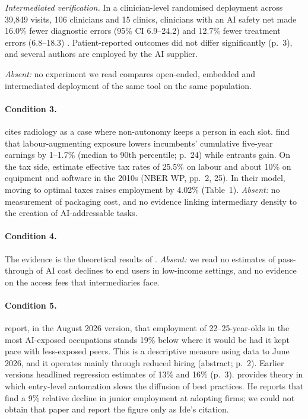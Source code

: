 \documentclass[12pt]{article}
\theoremstyle{remark}
\begin{document}
\emph{Intermediated verification.} In a clinician-level randomised deployment across 39,849 visits, 106 clinicians and 15 clinics, clinicians with an AI safety net made 16.0\% fewer diagnostic errors (95\% CI 6.9--24.2) and 12.7\% fewer treatment errors (6.8--18.3) \citep[Table~3, p.~16]{korom2025penda}. Patient-reported outcomes did not differ significantly (p.~3), and several authors are employed by the AI supplier.

\emph{Absent:} no experiment we read compares open-ended, embedded and intermediated deployment of the same tool on the same population.

\paragraph{Condition 3.} \citet[pp.~34--35]{garicano2026comment} cites radiology as a case where non-autonomy keeps a person in each slot. \citet{kogan2023displacement} find that labour-augmenting exposure lowers incumbents' cumulative five-year earnings by 1--1.7\% (median to 90th percentile; p.~24) while entrants gain. On the tax side, \citet{acemoglu2020tax} estimate effective tax rates of 25.5\% on labour and about 10\% on equipment and software in the 2010s (NBER WP, pp.~2, 25). In their model, moving to optimal taxes raises employment by 4.02\% (Table~1). \emph{Absent:} no measurement of packaging cost, and no evidence linking intermediary density to the creation of AI-addressable tasks.

\paragraph{Condition 4.} The evidence is the theoretical results of \citet[pp.~99, 106, 110--111]{athey2026competition}. \emph{Absent:} we read no estimates of pass-through of AI cost declines to end users in low-income settings, and no evidence on the access fees that intermediaries face.

\paragraph{Condition 5.} \citet{brynjolfsson2025canaries} report, in the August 2026 version, that employment of 22--25-year-olds in the most AI-exposed occupations stands 19\% below where it would be had it kept pace with less-exposed peers. This is a descriptive measure using data to June 2026, and it operates mainly through reduced hiring (abstract; p.~2). Earlier versions headlined regression estimates of 13\% and 16\% (p.~3). \citet[pp.~26--28]{ide2025automation} provides theory in which entry-level automation slows the diffusion of best practices. He reports that \citet{hosseini2025seniority} find a 9\% relative decline in junior employment at adopting firms; we could not obtain that paper and report the figure only as Ide's citation.
\end{document}

